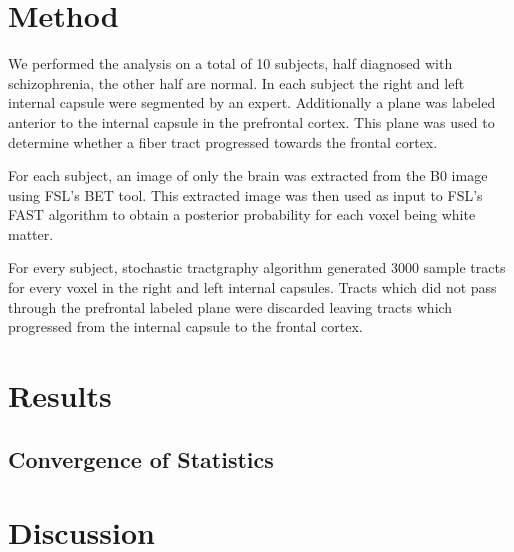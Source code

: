 \section{Method}
We performed the analysis on a total of 10 subjects, half diagnosed with schizophrenia, the other half are normal.  In each subject the right and left internal capsule were segmented by an expert.  Additionally a plane was labeled anterior to the internal capsule in the prefrontal cortex.  This plane was used to determine whether a fiber tract progressed towards the frontal cortex.

For each subject, an image of only the brain was extracted from the B0 image using FSL's BET tool.  This extracted image was then used as input to FSL's FAST algorithm to obtain a posterior probability for each voxel being white matter.

For every subject, stochastic tractgraphy algorithm generated 3000 sample tracts for every voxel in the right and left internal capsules.  Tracts which did not pass through the prefrontal labeled plane were discarded leaving tracts which progressed from the internal capsule to the frontal cortex.

\section{Results}



\subsection{Convergence of Statistics}
\section{Discussion}
